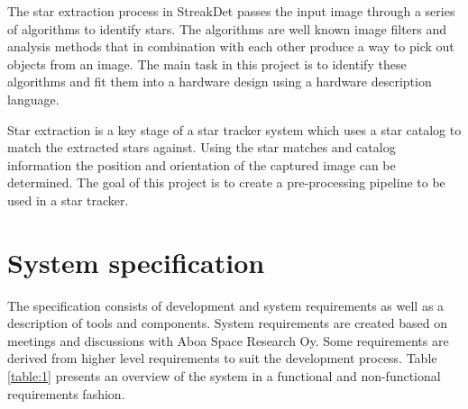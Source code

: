 \documentclass[12pt]{report}
\begin{document}
The star extraction process in StreakDet passes the input image through a series of algorithms to identify stars. The algorithms are well known image filters and analysis methods that in combination with each other produce a way to pick out objects from an image. The main task in this project is to identify these algorithms and fit them into a hardware design using a hardware description language.
\par
Star extraction is a key stage of a star tracker system which uses a star catalog to match the extracted stars against. Using the star matches and catalog information the position and orientation of the captured image can be determined. The goal of this project is to create a pre-processing pipeline to be used in a star tracker.

\section{System specification}

The specification consists of development and system requirements as well as a description of tools and components. System requirements are created based on meetings and discussions with Aboa Space Research Oy. Some requirements are derived from higher level requirements to suit the development process. Table \ref{table:1} presents an overview of the system in a functional and non-functional requirements fashion.
\end{document}
